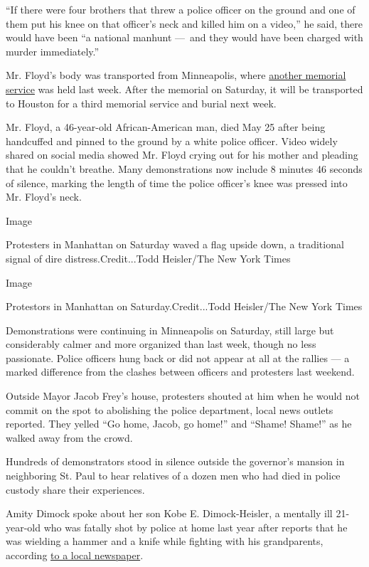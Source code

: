 ``If there were four brothers that threw a police officer on the ground
and one of them put his knee on that officer's neck and killed him on a
video,'' he said, there would have been ``a national manhunt ---~and
they would have been charged with murder immediately.''

Mr. Floyd's body was transported from Minneapolis, where
\href{https://www.nytimes3xbfgragh.onion/2020/06/04/us/floyd-memorial-funeral.html}{another
memorial service} was held last week. After the memorial on Saturday, it
will be transported to Houston for a third memorial service and burial
next week.

Mr. Floyd, a 46-year-old African-American man, died May 25 after being
handcuffed and pinned to the ground by a white police officer. Video
widely shared on social media showed Mr. Floyd crying out for his mother
and pleading that he couldn't breathe. Many demonstrations now include 8
minutes 46 seconds of silence, marking the length of time the police
officer's knee was pressed into Mr. Floyd's neck.

Image

Protesters in Manhattan on Saturday waved a flag upside down, a
traditional signal of dire distress.Credit...Todd Heisler/The New York
Times

Image

Protestors in Manhattan on Saturday.Credit...Todd Heisler/The New York
Times

Demonstrations were continuing in Minneapolis on Saturday, still large
but considerably calmer and more organized than last week, though no
less passionate. Police officers hung back or did not appear at all at
the rallies --- a marked difference from the clashes between officers
and protesters last weekend.

Outside Mayor Jacob Frey's house, protesters shouted at him when he
would not commit on the spot to abolishing the police department, local
news outlets reported. They yelled ``Go home, Jacob, go home!'' and
``Shame! Shame!'' as he walked away from the crowd.

Hundreds of demonstrators stood in silence outside the governor's
mansion in neighboring St. Paul to hear relatives of a dozen men who had
died in police custody share their experiences.

Amity Dimock spoke about her son Kobe E. Dimock-Heisler, a mentally ill
21-year-old who was fatally shot by police at home last year after
reports that he was wielding a hammer and a knife while fighting with
his grandparents, according
\href{https://www.startribune.com/hundreds-take-floyd-protests-to-ag-s-office-u-s-bank-stadium/571057032/?refresh=true}{to
a local newspaper}.

